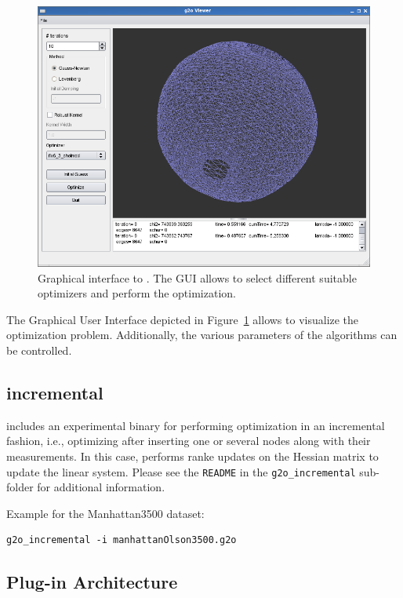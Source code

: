 \documentclass[a4paper]{article}
\begin{document}
\begin{figure}
  \centering
  \includegraphics[width=0.7\columnwidth]{pics/viewer}
  \caption{Graphical interface to \gopt. The GUI allows to select
  different suitable optimizers and perform the optimization.}
  \label{fig:viewer}
\end{figure}

The Graphical User Interface depicted in Figure~\ref{fig:viewer} allows
to visualize the optimization problem. Additionally, the various
parameters of the algorithms can be controlled.

\subsection{\gopt{} incremental}

\gopt{} includes an experimental binary for performing optimization in
an incremental fashion, i.e., optimizing after inserting one or several
nodes along with their measurements. In this case, \gopt{} performs
ranke updates on the Hessian matrix to update the linear system. Please
see the \verb+README+ in the \verb+g2o_incremental+ sub-folder for
additional information.

Example for the Manhattan3500 dataset:
\begin{verbatim}
g2o_incremental -i manhattanOlson3500.g2o
\end{verbatim}

\subsection{Plug-in Architecture}
\end{document}

